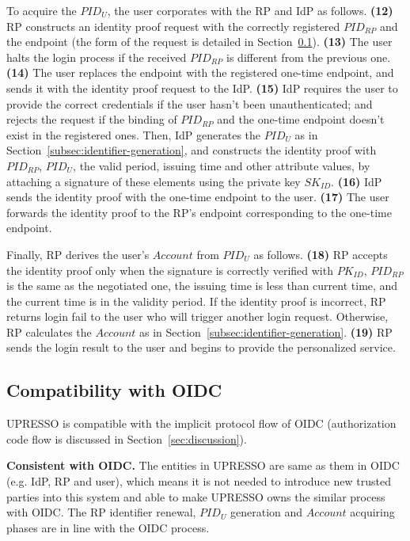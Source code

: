 To acquire the $PID_U$, the user corporates with the RP and IdP as follows. \textbf{(12)} RP constructs an identity proof request with the correctly registered $PID_{RP}$ and the endpoint (the form of the request is detailed in Section~\ref{subsec:compatible}). \textbf{(13)} The user halts the login process if the received $PID_{RP}$ is different from the previous one. \textbf{(14)} The user replaces the endpoint with the registered one-time endpoint, and sends it with the identity proof request to the IdP. \textbf{(15)} IdP requires the user to provide the correct credentials if the user hasn't been unauthenticated; and rejects the request if the binding of $PID_{RP}$ and the one-time endpoint doesn't exist in the registered ones. Then, IdP generates the $PID_U$ as in Section~\ref{subsec:identifier-generation}, and constructs the identity proof with $PID_{RP}$, $PID_U$, the valid period, issuing time and other attribute values, by attaching a signature of these elements using the private key $SK_{ID}$. \textbf{(16)} IdP sends the identity proof with the one-time endpoint to the user. \textbf{(17)} The user forwards the identity proof to the RP's endpoint corresponding to the one-time endpoint.

Finally, RP derives the user's  $Account$ from $PID_U$ as follows. \textbf{(18)} RP accepts the identity proof only when the signature is correctly verified with $PK_{ID}$, $PID_{RP}$ is the same as the negotiated one, the issuing time is less than current time, and the current time is in the validity period. If the identity proof is incorrect, RP returns login fail to the user who will trigger another login request. Otherwise, RP calculates the $Account$ as in Section~\ref{subsec:identifier-generation}. \textbf{(19)} RP sends the login result to the user and begins to provide the personalized service.


\subsection{Compatibility with OIDC}
\label{subsec:compatible}
UPRESSO is compatible with the implicit protocol flow of OIDC (authorization code flow is discussed in Section~\ref{sec:discussion}).

\vspace{1mm}\noindent \textbf{Consistent with OIDC.} 
The entities in UPRESSO are same as them in OIDC (e.g. IdP, RP and user), which means it is not needed to introduce new trusted parties into this system and able to make UPRESSO owns the similar process with OIDC. The RP identifier renewal, $PID_U$ generation and $Account$ acquiring phases are in line with the OIDC process.


